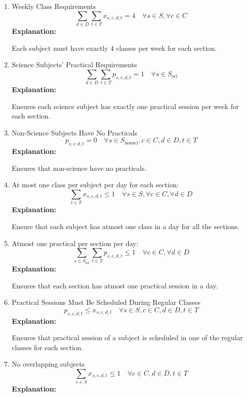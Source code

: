 \documentclass[11pt]{article}
\begin{document}
\begin{enumerate}
    \item Weekly Class Requirements
    \[
    \sum_{d \in D} \sum_{t \in T} x_{s,c,d,t} = 4 \quad \forall s \in S, \forall c \in C
    \]
    \textbf{Explanation:} 

    Each subject must have exactly 4 classes per week for each section.

    \item Science Subjects' Practical Requirements
    \[
    \sum_{d \in D}\sum_{t \in T} p_{s,c,d,t} = 1 \quad \forall s \in S_{\text{sci}}
    \]
    \textbf{Explanation:} 

    Ensures each science subject has exactly one practical session per week for each section.

    \item Non-Science Subjects Have No Practicals
    \[
    p_{s,c,d,t} = 0 \quad \forall s \in S_{\text{nonsci}}, c \in C, d \in D, t \in T
    \]
    \textbf{Explanation:} 

    Ensures that non-science have no practicals.
    
    \item At most one class per subject per day for each section:
    \[
    \sum_{t \in T} x_{s,c,d,t} \leq 1 \quad \forall s \in S, \forall c \in C, \forall d \in D
    \]
    \textbf{Explanation:} 

    Ensure that each subject has atmost one class in a day for all the sections.

    \item Atmost one practical per section per day:
    \[
    \sum_{s \in S_\text{sci}} \sum_{t \in T} p_{s,c,d,t} \leq 1 \quad \forall c \in C, \forall d \in D
    \]
    \textbf{Explanation:} 

    Ensures that each section has atmost one practical session in a day.
    
    \item Practical Sessions Must Be Scheduled During Regular Classes
    \[
        p_{s,c,d,t} \leq x_{s,c,d,t} \quad \forall s \in S, c \in C, d \in D, t \in T
    \]
    \textbf{Explanation:} 

    Ensures that practical session of a subject is scheduled in one of the regular classes for each section. 

    \item No overlapping subjects
    \[
        \sum_{s \in S} x_{s,c,d,t} \leq 1 \quad \forall c \in C, d \in D, t \in T
    \]
    \textbf{Explanation:} 


\end{enumerate}
\end{document}
